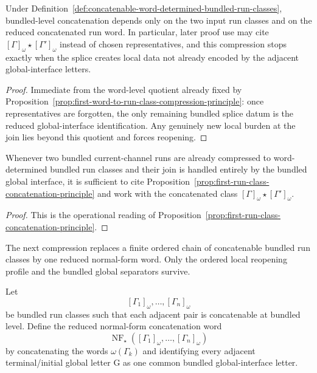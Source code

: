 \begin{proposition}
\label{prop:first-run-class-concatenation-principle}
Under Definition~\ref{def:concatenable-word-determined-bundled-run-classes}, bundled-level concatenation depends only on the two input run classes and on the reduced concatenated run word. In particular, later proof use may cite $[\Gamma]_{\omega}\star[\Gamma']_{\omega}$ instead of chosen representatives, and this compression stops exactly when the splice creates local data not already encoded by the adjacent global-interface letters.
\end{proposition}

\begin{proof}
Immediate from the word-level quotient already fixed by Proposition~\ref{prop:first-word-to-run-class-compression-principle}: once representatives are forgotten, the only remaining bundled splice datum is the reduced global-interface identification. Any genuinely new local burden at the join lies beyond this quotient and forces reopening.
\end{proof}

\begin{corollary}
\label{cor:use-rule-for-the-first-run-class-concatenation-principle}
Whenever two bundled current-channel runs are already compressed to word-determined bundled run classes and their join is handled entirely by the bundled global interface, it is sufficient to cite Proposition~\ref{prop:first-run-class-concatenation-principle} and work with the concatenated class $[\Gamma]_{\omega}\star[\Gamma']_{\omega}$.
\end{corollary}

\begin{proof}
This is the operational reading of Proposition~\ref{prop:first-run-class-concatenation-principle}.
\end{proof}

\begin{remark}
\label{rem:status-of-the-first-finite-run-class-normal-form-step}
The next compression replaces a finite ordered chain of concatenable bundled run classes by one reduced normal-form word. Only the ordered local reopening profile and the bundled global separators survive.
\end{remark}

\begin{definition}
\label{def:finite-concatenable-bundled-run-class-chain-and-reduced-normal-form-word}
Let
\[
[\Gamma_1]_{\omega},\dots,[\Gamma_n]_{\omega}
\]
be bundled run classes such that each adjacent pair is concatenable at bundled level. Define the reduced normal-form concatenation word
\[
\operatorname{NF}_{\star}([\Gamma_1]_{\omega},\dots,[\Gamma_n]_{\omega})
\]
by concatenating the words $\omega(\Gamma_k)$ and identifying every adjacent terminal/initial global letter $\mathrm G$ as one common bundled global-interface letter.
\end{definition}


